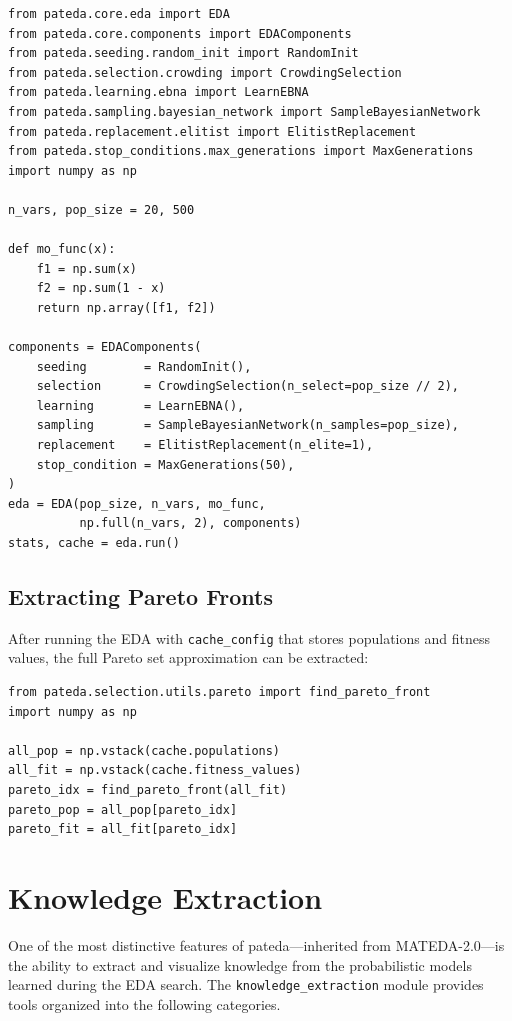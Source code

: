 \documentclass[a4paper,11pt]{article}
\begin{document}
\begin{lstlisting}
from pateda.core.eda import EDA
from pateda.core.components import EDAComponents
from pateda.seeding.random_init import RandomInit
from pateda.selection.crowding import CrowdingSelection
from pateda.learning.ebna import LearnEBNA
from pateda.sampling.bayesian_network import SampleBayesianNetwork
from pateda.replacement.elitist import ElitistReplacement
from pateda.stop_conditions.max_generations import MaxGenerations
import numpy as np

n_vars, pop_size = 20, 500

def mo_func(x):
    f1 = np.sum(x)
    f2 = np.sum(1 - x)
    return np.array([f1, f2])

components = EDAComponents(
    seeding        = RandomInit(),
    selection      = CrowdingSelection(n_select=pop_size // 2),
    learning       = LearnEBNA(),
    sampling       = SampleBayesianNetwork(n_samples=pop_size),
    replacement    = ElitistReplacement(n_elite=1),
    stop_condition = MaxGenerations(50),
)
eda = EDA(pop_size, n_vars, mo_func,
          np.full(n_vars, 2), components)
stats, cache = eda.run()
\end{lstlisting}

\subsection{Extracting Pareto Fronts}

After running the EDA with \texttt{cache\_config} that stores populations and
fitness values, the full Pareto set approximation can be extracted:

\begin{lstlisting}
from pateda.selection.utils.pareto import find_pareto_front
import numpy as np

all_pop = np.vstack(cache.populations)
all_fit = np.vstack(cache.fitness_values)
pareto_idx = find_pareto_front(all_fit)
pareto_pop = all_pop[pareto_idx]
pareto_fit = all_fit[pareto_idx]
\end{lstlisting}

\section{Knowledge Extraction}
\label{sec:knowledge}

One of the most distinctive features of pateda---inherited from MATEDA-2.0---is
the ability to extract and visualize knowledge from the probabilistic models
learned during the EDA search.  The \texttt{knowledge\_extraction} module
provides tools organized into the following categories.
\end{document}
